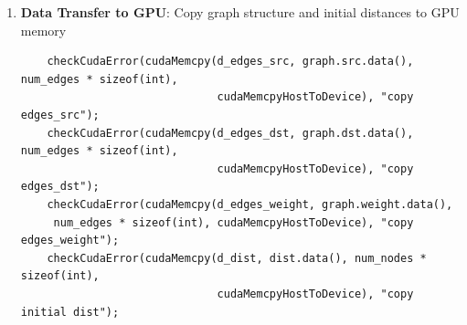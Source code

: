 \documentclass{article}
\begin{document}
\begin{enumerate}
    \item \textbf{Data Transfer to GPU}: Copy graph structure and initial distances to GPU memory
    \begin{verbatim}
    checkCudaError(cudaMemcpy(d_edges_src, graph.src.data(), num_edges * sizeof(int), 
                              cudaMemcpyHostToDevice), "copy edges_src");
    checkCudaError(cudaMemcpy(d_edges_dst, graph.dst.data(), num_edges * sizeof(int), 
                              cudaMemcpyHostToDevice), "copy edges_dst");
    checkCudaError(cudaMemcpy(d_edges_weight, graph.weight.data(),
     num_edges * sizeof(int), cudaMemcpyHostToDevice), "copy edges_weight");
    checkCudaError(cudaMemcpy(d_dist, dist.data(), num_nodes * sizeof(int), 
                              cudaMemcpyHostToDevice), "copy initial dist");
    \end{verbatim}
\end{enumerate}
\end{document}
